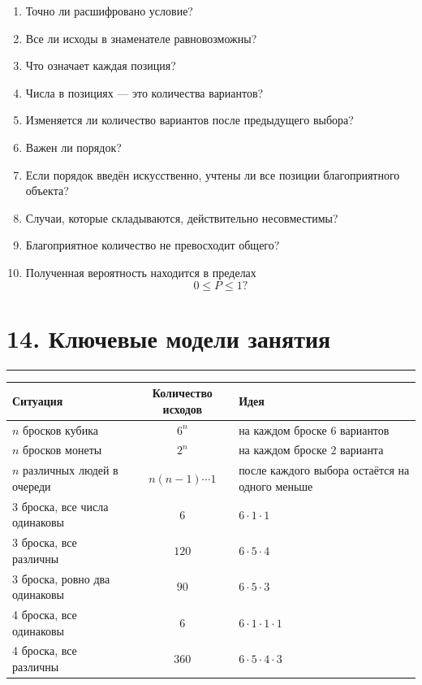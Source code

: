 \documentclass[a4paper,12pt]{article}
\newcommand{\sectionline}{%
    \vspace{0.2em}
    {\color{accent}\rule{\linewidth}{0.7pt}}
    \vspace{0.4em}
}
\begin{document}
\begin{enumerate}[leftmargin=1.7em]
    \item Точно ли расшифровано условие?
    \item Все ли исходы в знаменателе равновозможны?
    \item Что означает каждая позиция?
    \item Числа в позициях --- это количества вариантов?
    \item Изменяется ли количество вариантов после предыдущего выбора?
    \item Важен ли порядок?
    \item Если порядок введён искусственно, учтены ли все позиции благоприятного объекта?
    \item Случаи, которые складываются, действительно несовместимы?
    \item Благоприятное количество не превосходит общего?
    \item Полученная вероятность находится в пределах
    \[
    0\le P\le1?
    \]
\end{enumerate}

\section*{14. Ключевые модели занятия}
\sectionline

\begin{center}
\renewcommand{\arraystretch}{1.35}
\begin{tabularx}{\linewidth}{@{}XcX@{}}
\toprule
Ситуация & Количество исходов & Идея \\
\midrule
\(n\) бросков кубика & \(6^n\) & на каждом броске \(6\) вариантов \\
\(n\) бросков монеты & \(2^n\) & на каждом броске \(2\) варианта \\
\(n\) различных людей в очереди & \(n(n-1)\cdots1\) & после каждого выбора остаётся на одного меньше \\
3 броска, все числа одинаковы & \(6\) & \(6\cdot1\cdot1\) \\
3 броска, все различны & \(120\) & \(6\cdot5\cdot4\) \\
3 броска, ровно два одинаковы & \(90\) & \(6\cdot5\cdot3\) \\
4 броска, все одинаковы & \(6\) & \(6\cdot1\cdot1\cdot1\) \\
4 броска, все различны & \(360\) & \(6\cdot5\cdot4\cdot3\) \\
\bottomrule
\end{tabularx}
\end{center}
\end{document}
